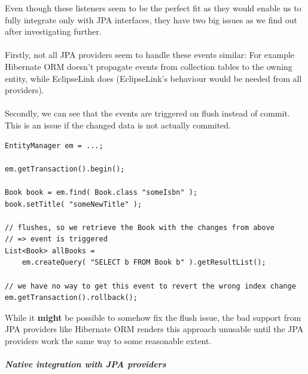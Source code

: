 \noindent
Even though these listeners seem to be the perfect fit as they would enable us to fully integrate only with JPA interfaces, they have two big issues as we find out after investigating further.
\\\\
Firstly, not all JPA providers seem to handle these events similar: For example Hibernate ORM doesn't propagate events from collection tables to the owning entity, while EclipseLink does (EclipseLink's behaviour would be needed from all providers).
\\\\
Secondly, we can see that the events are triggered on flush instead of commit. This is an issue if the changed data is not actually commited.
\\

\lstset{language=java}
\begin{lstlisting}[frame=htrbl, caption={Event triggering on flush}, label={lst:flush_event.java}]
EntityManager em = ...;

em.getTransaction().begin();

Book book = em.find( Book.class "someIsbn" );
book.setTitle( "someNewTitle" );

// flushes, so we retrieve the Book with the changes from above
// => event is triggered
List<Book> allBooks = 
	em.createQuery( "SELECT b FROM Book b" ).getResultList();

// we have no way to get this event to revert the wrong index change
em.getTransaction().rollback();
\end{lstlisting}

\noindent
While it \textbf{might} be possible to somehow fix the flush issue, the bad support from JPA providers like Hibernate ORM renders this approach unusable until the JPA providers work the same way to some reasonable extent.

\pagebreak

\subparagraph{Native integration with JPA providers}

